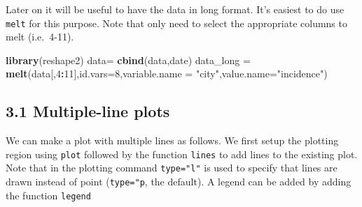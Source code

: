 \documentclass[11pt,]{article}
\newenvironment{Shaded}{\begin{snugshade}}{\end{snugshade}}
\newcommand{\KeywordTok}[1]{\textcolor[rgb]{0.13,0.29,0.53}{\textbf{#1}}}
\newcommand{\DataTypeTok}[1]{\textcolor[rgb]{0.13,0.29,0.53}{#1}}
\newcommand{\DecValTok}[1]{\textcolor[rgb]{0.00,0.00,0.81}{#1}}
\newcommand{\StringTok}[1]{\textcolor[rgb]{0.31,0.60,0.02}{#1}}
\newcommand{\ControlFlowTok}[1]{\textcolor[rgb]{0.13,0.29,0.53}{\textbf{#1}}}
\newcommand{\OperatorTok}[1]{\textcolor[rgb]{0.81,0.36,0.00}{\textbf{#1}}}
\newcommand{\NormalTok}[1]{#1}
\begin{document}
Later on it will be useful to have the data in long format. It's easiest
to do use \texttt{melt} for this purpose. Note that only need to select
the appropriate columns to melt (i.e.~4-11).

\begin{Shaded}
\begin{Highlighting}[]
\KeywordTok{library}\NormalTok{(reshape2)}
\NormalTok{data=}\StringTok{ }\KeywordTok{cbind}\NormalTok{(data,date)}
\NormalTok{data_long =}\StringTok{ }\KeywordTok{melt}\NormalTok{(data[,}\DecValTok{4}\OperatorTok{:}\DecValTok{11}\NormalTok{],}\DataTypeTok{id.vars=}\DecValTok{8}\NormalTok{,}\DataTypeTok{variable.name =} \StringTok{"city"}\NormalTok{,}\DataTypeTok{value.name=}\StringTok{"incidence"}\NormalTok{)}
\end{Highlighting}
\end{Shaded}

\subsection{3.1 Multiple-line plots}\label{multiple-line-plots}

We can make a plot with multiple lines as follows. We first setup the
plotting region using \texttt{plot} followed by the function
\texttt{lines} to add lines to the existing plot. Note that in the
plotting command \texttt{type="l"} is used to specify that lines are
drawn instead of point (\texttt{type="p}, the default). A legend can be
added by adding the function \texttt{legend}

\begin{Shaded}
\end{Shaded}
\end{document}
